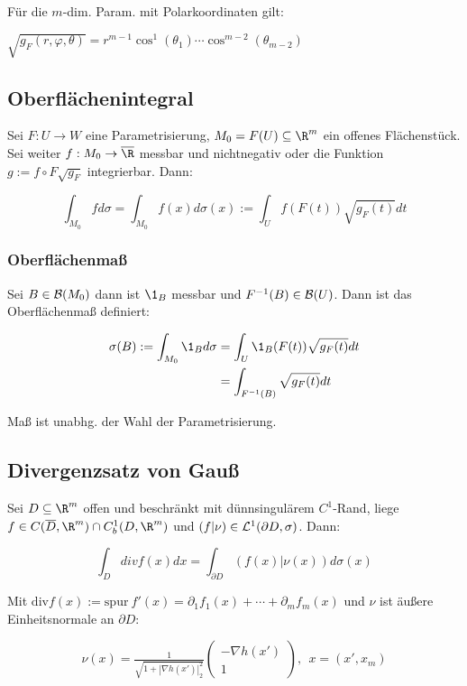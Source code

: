 \spacing

Für die $m$-dim. Param. mit Polarkoordinaten gilt:

$\sqrt{g_F(r,\varphi,\theta)} = r^{m-1} \cos^1(\theta_1) \cdots \cos^{m-2}(\theta_{m-2})$

\subsection*{Oberflächenintegral}

Sei $F : U \to W$ eine Parametrisierung, $M_0 = F(U) \subseteq \R^m$ ein offenes Flächenstück. Sei weiter $f : M_0 \to \overline\R$ messbar und nichtnegativ oder die Funktion $g := f \circ F \sqrt{g_F}$ integrierbar. Dann:

\vspace{-4mm}
\[ \int_{M_0} f d\sigma = \int_{M_0} f(x) d\sigma(x) := \int_U f(F(t))\sqrt{g_F(t)} dt \]

\subsubsection*{Oberflächenmaß}

Sei $B \in \mathcal{B}(M_0)$ dann ist $\1_B$ messbar und $F^{-1}(B) \in \mathcal{B}(U)$. Dann ist das Oberflächenmaß definiert:

\vspace{-4mm}
\begin{align*}
\sigma(B) := \int_{M_0} \1_B d\sigma &= \int_U \1_B(F(t)) \sqrt{g_F(t)} dt\\
                             &= \int_{F^{-1}(B)} \sqrt{g_F(t)} dt
\end{align*}

Maß ist unabhg. der Wahl der Parametrisierung.

\subsection*{Divergenzsatz von Gauß}

Sei $D \subseteq \R^m$ offen und beschränkt mit dünnsingulärem $C^1$-Rand, liege $f \in C(\overline D,\R^m) \cap C_b^1(D,\R^m)$ und $(f|\nu) \in \mathcal{L}^1(\partial D,\sigma)$. Dann:

\[ \int_D div f(x) dx = \int_{\partial D} (f(x)|\nu(x)) d\sigma(x) \]

Mit $\text{div} f(x) := \text{spur} \ f'(x) = \partial_1 f_1(x) + \cdots + \partial_m f_m(x)$ und $\nu$ ist äußere Einheitsnormale an $\partial D$:

\vspace{-4mm}
\[ \nu(x) = \tfrac{1}{\sqrt{1+|\nabla h(x')|_2^2}} \begin{pmatrix} -\nabla h(x') \\ 1 \end{pmatrix}, \ \ x = (x',x_m) \]

